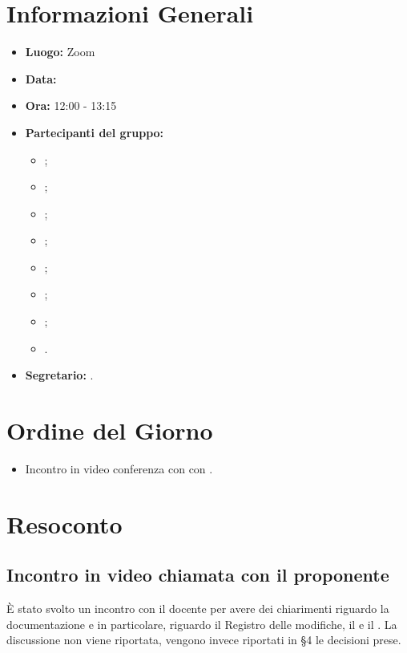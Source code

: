 \section{Informazioni Generali}
\begin{itemize}
	\item \textbf{Luogo:} Zoom
	\item \textbf{Data:} \Data
	\item \textbf{Ora:} 12:00 - 13:15
	\item \textbf{Partecipanti del gruppo:}
	\begin{itemize}
		\item \AT{};
		\item \BR{};  
		\item \CE{}; 
		\item \DF{};
		\item \LD{};
		\item \MC{};
		\item \PF{};
		\item \SE{}.
	\end{itemize} 
	\item \textbf{Segretario:} \DF{}.
\end{itemize}

\section{Ordine del Giorno}
\begin{itemize}
	\item Incontro in video conferenza con con \VT{}.
\end{itemize}

\section{Resoconto}

\subsection{Incontro in video chiamata con il proponente}
È stato svolto un incontro con il docente per avere dei chiarimenti riguardo la documentazione e in particolare, riguardo il Registro delle modifiche, il \MU{} e il \PdP{}.
La discussione non viene riportata, vengono invece riportati in §4 le decisioni prese.
\clearpage